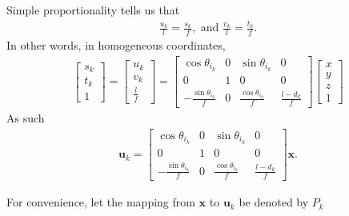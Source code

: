 \documentclass[10pt]{article}
\newcommand{\ve}[1]{\mathbf{#1}}
\begin{document}
\begin{itemize}
	    Simple proportionality tells us that
	    \begin{align*}
	    	\frac{u_k}{l} = \frac{s_k}{f},  \mbox{ and } \frac{v_k}{l} = \frac{t_k}{f}.
	    \end{align*}
	    In other words, in homogeneous coordinates,
	    \begin{align*}
	    	\begin{bmatrix}
	    		s_k \\ t_k \\ 1
	    	\end{bmatrix}
	    	=
	    	\begin{bmatrix}
	    		u_k \\
	    		v_k \\
	    		\frac{l}{f}
			\end{bmatrix}
			=
			\begin{bmatrix}
	    		\cos \theta_{i_k} & 0 & \sin \theta_{i_k} & 0\\
	    		0 & 1 & 0 & 0\\
	    		-\frac{\sin \theta_{i_k}}{f} & 0 & \frac{\cos \theta_{i_k}}{f} & \frac{l-d_k}{f}
	    	\end{bmatrix}
	    	\begin{bmatrix}
	    		x \\ y \\ z \\ 1
	    	\end{bmatrix}
	    \end{align*}
	    As such
	    \begin{align*}
	    	\ve{u}_k =
	    	\begin{bmatrix}
	    		\cos \theta_{i_k} & 0 & \sin \theta_{i_k} & 0\\
	    		0 & 1 & 0 & 0\\
	    		-\frac{\sin \theta_{i_k}}{f} & 0 & \frac{\cos \theta_{i_k}}{f} & \frac{l-d_k}{f}
	    	\end{bmatrix}
	    	\ve{x}.
	    \end{align*}

	    For convenience, let the mapping from $\ve{x}$ to $\ve{u}_k$ be denoted by $P_{k}$
	  \end{itemize}



	
	

	
\end{document}
